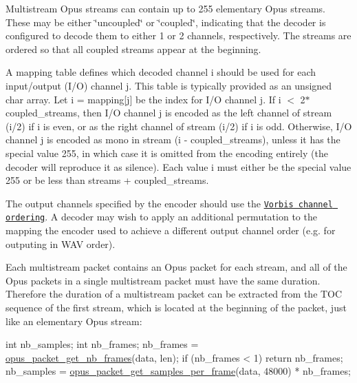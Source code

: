 Multistream Opus streams can contain up to 255 elementary Opus streams. These may be either \char`\"{}uncoupled\char`\"{} or \char`\"{}coupled\char`\"{}, indicating that the decoder is configured to decode them to either 1 or 2 channels, respectively. The streams are ordered so that all coupled streams appear at the beginning.

A {\ttfamily mapping} table defines which decoded channel {\ttfamily i} should be used for each input/output (I/O) channel {\ttfamily j}. This table is typically provided as an unsigned char array. Let {\ttfamily i = mapping\mbox{[}j\mbox{]}} be the index for I/O channel {\ttfamily j}. If {\ttfamily i $<$ 2$\ast$coupled\+\_\+streams}, then I/O channel {\ttfamily j} is encoded as the left channel of stream {\ttfamily (i/2)} if {\ttfamily i} is even, or as the right channel of stream {\ttfamily (i/2)} if {\ttfamily i} is odd. Otherwise, I/O channel {\ttfamily j} is encoded as mono in stream {\ttfamily (i -\/ coupled\+\_\+streams)}, unless it has the special value 255, in which case it is omitted from the encoding entirely (the decoder will reproduce it as silence). Each value {\ttfamily i} must either be the special value 255 or be less than {\ttfamily streams + coupled\+\_\+streams}.

The output channels specified by the encoder should use the \href{https://www.xiph.org/vorbis/doc/Vorbis_I_spec.html#x1-810004.3.9}{\tt Vorbis channel ordering}. A decoder may wish to apply an additional permutation to the mapping the encoder used to achieve a different output channel order (e.\+g. for outputing in W\+AV order).

Each multistream packet contains an Opus packet for each stream, and all of the Opus packets in a single multistream packet must have the same duration. Therefore the duration of a multistream packet can be extracted from the T\+OC sequence of the first stream, which is located at the beginning of the packet, just like an elementary Opus stream\+:


\begin{DoxyCode}
\textcolor{keywordtype}{int} nb\_samples;
\textcolor{keywordtype}{int} nb\_frames;
nb\_frames = \hyperlink{group__opus__decoder_ga932edb5fbae85cf452650ef390f52849}{opus\_packet\_get\_nb\_frames}(data, len);
\textcolor{keywordflow}{if} (nb\_frames < 1)
  \textcolor{keywordflow}{return} nb\_frames;
nb\_samples = \hyperlink{group__opus__decoder_ga885564fa670e308100dfda89d3cdea10}{opus\_packet\_get\_samples\_per\_frame}(data, 48000) * nb\_frames;
\end{DoxyCode}


